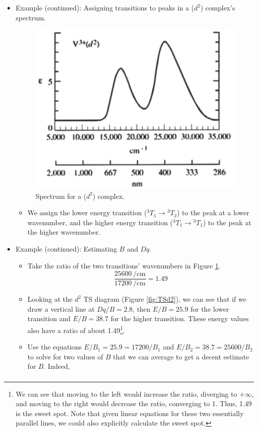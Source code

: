 \documentclass[../notes.tex]{subfiles}
\begin{document}
\begin{itemize}
    \item Example (continued): Assigning transitions to peaks in a  ($d^2$) complex's spectrum.
    \begin{figure}[h!]
        \centering
        \includegraphics[width=0.35\linewidth]{../ExtFiles/spectrumV3.png}
        \caption{Spectrum for a  ($d^2$) complex.}
        \label{fig:spectrumV3}
    \end{figure}
    \begin{itemize}
        \item We assign the lower energy transition (${}^3T_1\to{}^3T_2$) to the peak at a lower wavenumber, and the higher energy transition (${}^3T_1\to{}^3T_1$) to the peak at the higher wavenumber.
    \end{itemize}
    \item Example (continued): Estimating $B$ and $Dq$.
    \begin{itemize}
        \item Take the ratio of the two transitions' wavenumbers in Figure \ref{fig:spectrumV3}.
        \begin{equation*}
            \frac{\SI{25600}{\per\centi\meter}}{\SI{17200}{\per\centi\meter}} = 1.49
        \end{equation*}
        \item Looking at the $d^2$ TS diagram (Figure \ref{fig:TSd2}), we can see that if we draw a vertical line at $Dq/B=2.8$, then $E/B=25.9$ for the lower transition and $E/B=38.7$ for the higher transition. These energy values also have a ratio of about 1.49\footnote{We can see that moving to the left would increase the ratio, diverging to $+\infty$, and moving to the right would decrease the ratio, converging to 1. Thus, 1.49 is the sweet spot. Note that given linear equations for these two essentially parallel lines, we could also explicitly calculate the sweet spot.}.
        \item Use the equations $E/B_1=25.9=17200/B_1$ and $E/B_2=38.7=25600/B_2$ to solve for two values of $B$ that we can average to get a decent estimate for $B$. Indeed,
        \begin{align*}

\end{align*}
\end{itemize}
\end{itemize}
\end{document}
